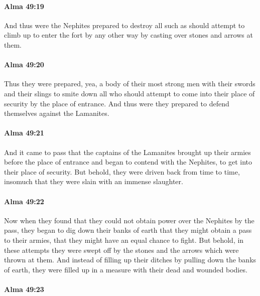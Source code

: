 		\paragraph{Alma 49:19} %
			\label{ALMA-49-19}

			And thus were the Nephites prepared to destroy all such
			as should attempt to climb up to enter the fort by any other way
			by casting over stones and arrows at them.

		\paragraph{Alma 49:20} %
			\label{ALMA-49-20}

			Thus they were prepared,
			yea, a body of their most strong men with their swords and their slings
			to smite down all who should attempt
			to come into their place of security by the place of entrance.
			And thus were they prepared to defend themselves against the Lamanites.

		\paragraph{Alma 49:21} %
			\label{ALMA-49-21}

			And it came to pass that
			the captains of the Lamanites brought up their armies
			before the place of entrance
			and began to contend with the Nephites,
			to get into their place of security.
			But behold, they were driven back from time to time,
			insomuch that they were slain with an immense slaughter.

		\paragraph{Alma 49:22} %
			\label{ALMA-49-22}

			Now when they found
			that they could not obtain power over the Nephites by the pass,
			they began to dig down their banks of earth
			that they might obtain a pass to their armies,
			that they might have an equal chance to fight.
			But behold, in these attempts they were swept off
			by the stones and the arrows which were thrown at them.
			And instead of filling up their ditches by pulling down the banks of earth,
			they were filled up in a measure with their dead and wounded bodies.

		\paragraph{Alma 49:23} %
			\label{ALMA-49-23}

